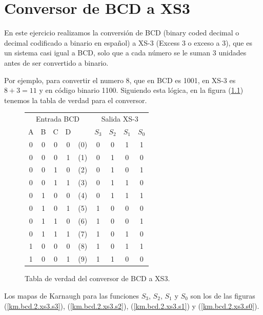 \documentclass[]{informeutn}
\begin{document}
  \maketitle

  \tableofcontents
  \setcounter{page}{1}
  \thispagestyle{plain}


  \chapter{Conversor de BCD a XS3}
    En este ejercicio realizamos la conversión de BCD (binary coded decimal o decimal codificado a binario en español)
    a XS-3 (Excess 3 o exceso a 3), que es un sistema casi igual a BCD, solo que a cada número se le suman 3 unidades
    antes de ser convertido a binario.

    Por ejemplo, para convertir el numero 8, que en BCD es 1001, en XS-3 es $8+3=11$ y en código binario 1100.
    Siguiendo esta lógica, en la figura (\ref{tt.bcd.2.xs3}) tenemos la tabla de verdad para el conversor.
    \begin{figure}[!ht]
      \centering
      \begin{tabular}{|c|c|c|c|c||c|c|c|c|}
      \hline
      \multicolumn{5}{|c||}{Entrada BCD} & \multicolumn{4}{c|}{Salida XS-3} \\
      A & B & C & D & & $S_3$ & $S_2$ & $S_1$ & $S_0$ \\
      \hline
      0 & 0 & 0 & 0 & (0) & 0 & 0 & 1 & 1 \\
      0 & 0 & 0 & 1 & (1) & 0 & 1 & 0 & 0 \\
      0 & 0 & 1 & 0 & (2) & 0 & 1 & 0 & 1 \\
      0 & 0 & 1 & 1 & (3) & 0 & 1 & 1 & 0 \\
      0 & 1 & 0 & 0 & (4) & 0 & 1 & 1 & 1 \\
      0 & 1 & 0 & 1 & (5) & 1 & 0 & 0 & 0 \\
      0 & 1 & 1 & 0 & (6) & 1 & 0 & 0 & 1 \\
      0 & 1 & 1 & 1 & (7) & 1 & 0 & 1 & 0 \\
      1 & 0 & 0 & 0 & (8) & 1 & 0 & 1 & 1 \\
      1 & 0 & 0 & 1 & (9) & 1 & 1 & 0 & 0 \\
      \hline
      \end{tabular}
      \caption{Tabla de verdad del conversor de BCD a XS3.}
      \label{tt.bcd.2.xs3}
    \end{figure}

    Los mapas de Karnaugh para las funciones $S_3$, $S_2$, $S_1$ y $S_0$ son los de las figuras (\ref{km.bcd.2.xs3.s3}),
    (\ref{km.bcd.2.xs3.s2}), (\ref{km.bcd.2.xs3.s1}) y (\ref{km.bcd.2.xs3.s0}).
\end{document}

